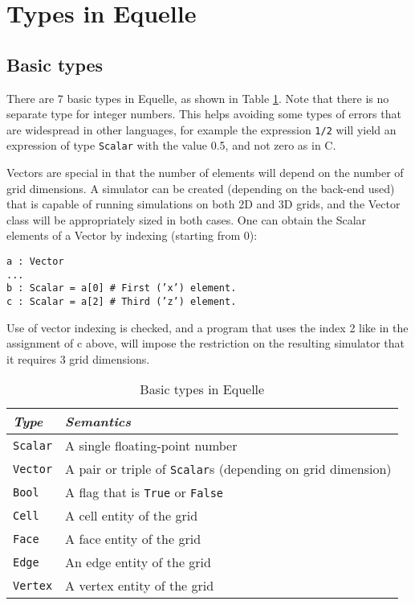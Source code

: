 \documentclass[11pt]{article}
\newcommand{\code}[1]{\texttt{#1}}
\begin{document}
\section{Types in Equelle}

\subsection{Basic types}

There are 7 basic types in Equelle, as shown in Table \ref{tab:basic-types}. Note that
there is no separate type for integer numbers. This helps avoiding some types of errors
that are widespread in other languages, for example the expression \code{1/2} will
yield an expression of type \code{Scalar} with the value 0.5, and not zero as in C.

Vectors are special in that the number of elements will depend on the number of grid
dimensions. A simulator can be created (depending on the back-end used) that is capable of
running simulations on both 2D and 3D grids, and the Vector class will be appropriately
sized in both cases. One can obtain the Scalar elements of a Vector by indexing (starting
from 0):

\code{a : Vector \\
... \\
b : Scalar = a[0]    \# First ('x') element. \\
c : Scalar = a[2]    \# Third ('z') element.
}

Use of vector indexing is checked, and a program that uses the index 2 like in the
assignment of c above, will impose the restriction on the resulting simulator that it
requires 3 grid dimensions.

\begin{table}
\begin{tabular}{l|l}
{\em Type} & {\em Semantics} \\
\hline
\code{Scalar} & A single floating-point number \\
\code{Vector} & A pair or triple of \code{Scalar}s (depending on grid dimension) \\
\code{Bool} & A flag that is \code{True} or \code{False} \\
\code{Cell} & A cell entity of the grid \\
\code{Face} & A face entity of the grid \\
\code{Edge} & An edge entity of the grid \\
\code{Vertex} & A vertex entity of the grid \\
\end{tabular}
\caption{Basic types in Equelle}
\label{tab:basic-types}
\end{table}
\end{document}
